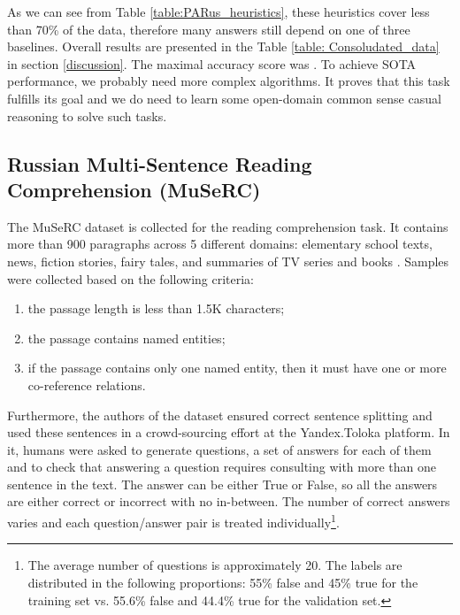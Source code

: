 \documentclass[11pt]{article}
\begin{document}
As we can see from Table \ref{table:PARus_heuristics}, these heuristics cover less than 70\% of the data, therefore many answers still depend on one of three baselines. Overall results are presented in the Table \ref{table: Consoludated_data} in section \ref{discussion}. The maximal accuracy score was . To achieve SOTA performance, we probably need more complex algorithms. It proves that this task fulfills its goal and we do need to learn some open-domain common sense casual reasoning to solve such tasks. 

\subsection{Russian Multi-Sentence Reading Comprehension (MuSeRC)}

The MuSeRC dataset is collected for the reading comprehension task. It contains more than 900 paragraphs across 5 different domains: elementary school texts, news, fiction stories, fairy tales, and summaries of TV series and books \cite{fenogenova-etal-2020-read}. Samples were collected based on the following criteria: 
\begin{enumerate}
    \item the passage length is less than 1.5K characters;
    \item the passage contains named entities;
    \item if the passage contains only one named entity, then it must have one or more co-reference relations.
\end{enumerate}

Furthermore, the authors of the dataset ensured correct sentence splitting and used these sentences in a crowd-sourcing effort at the Yandex.Toloka platform. In it, humans were asked to generate questions, a set of answers for each of them and to check that answering a question requires consulting with more than one sentence in the text. The answer can be either True or False, so all the answers are either correct or incorrect with no in-between. The number of correct answers varies and each question/answer pair is treated individually\footnote{The average number of questions is approximately 20. The labels are distributed in the following proportions: 55\% false and 45\% true for the training set vs. 55.6\% false and 44.4\% true for the validation set.}.
\end{document}
